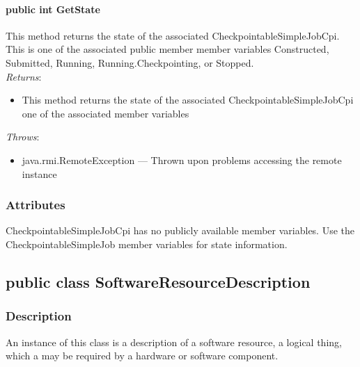 \documentclass[$Date: 2003/06/26 19:29:31 $]{glabarticle}
\begin{document}
\paragraph{public int GetState}

This method returns the state of the associated
CheckpointableSimpleJobCpi. This is one of the associated public member
member variables Constructed, Submitted, Running,
Running.Checkpointing, or Stopped. \\

 \textit{Returns}:
 \begin{itemize}
 \item[] This method returns the state of the associated CheckpointableSimpleJobCpi one of the associated 
 member variables
 \end{itemize} 

 \textit{Throws}:
 \begin{itemize}
 \item[] java.rmi.RemoteException --- Thrown upon problems accessing the remote instance 
 \end{itemize}


\subsubsection{Attributes}

CheckpointableSimpleJobCpi has no publicly available member variables. Use the CheckpointableSimpleJob
member variables for state information. 


\newpage

\subsection{public class SoftwareResourceDescription}


\subsubsection{Description}

An instance of this class is a description of a software resource, a
logical thing, which a may be required by a hardware or software
component.\\
\end{document}
